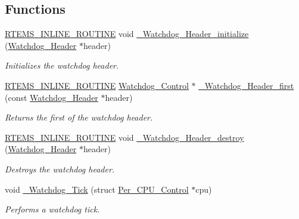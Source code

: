 \subsection*{Functions}
\begin{DoxyCompactItemize}
\item 
\mbox{\hyperlink{group__RTEMSScoreBaseDefs_gac216239df231d5dbd15e3520b0b9313f}{R\+T\+E\+M\+S\+\_\+\+I\+N\+L\+I\+N\+E\+\_\+\+R\+O\+U\+T\+I\+NE}} void \mbox{\hyperlink{group__RTEMSScoreWatchdog_ga6566cd6322fc45173038e64d3232dc0b}{\+\_\+\+Watchdog\+\_\+\+Header\+\_\+initialize}} (\mbox{\hyperlink{structWatchdog__Header}{Watchdog\+\_\+\+Header}} $\ast$header)
\begin{DoxyCompactList}\small\item\em Initializes the watchdog header. \end{DoxyCompactList}\item 
\mbox{\hyperlink{group__RTEMSScoreBaseDefs_gac216239df231d5dbd15e3520b0b9313f}{R\+T\+E\+M\+S\+\_\+\+I\+N\+L\+I\+N\+E\+\_\+\+R\+O\+U\+T\+I\+NE}} \mbox{\hyperlink{structWatchdog__Control}{Watchdog\+\_\+\+Control}} $\ast$ \mbox{\hyperlink{group__RTEMSScoreWatchdog_ga9b0af8778de4a421e9ef517ff371bb3b}{\+\_\+\+Watchdog\+\_\+\+Header\+\_\+first}} (const \mbox{\hyperlink{structWatchdog__Header}{Watchdog\+\_\+\+Header}} $\ast$header)
\begin{DoxyCompactList}\small\item\em Returns the first of the watchdog header. \end{DoxyCompactList}\item 
\mbox{\hyperlink{group__RTEMSScoreBaseDefs_gac216239df231d5dbd15e3520b0b9313f}{R\+T\+E\+M\+S\+\_\+\+I\+N\+L\+I\+N\+E\+\_\+\+R\+O\+U\+T\+I\+NE}} void \mbox{\hyperlink{group__RTEMSScoreWatchdog_ga7227eda50b7bf164aa31cfcd9a9d8cca}{\+\_\+\+Watchdog\+\_\+\+Header\+\_\+destroy}} (\mbox{\hyperlink{structWatchdog__Header}{Watchdog\+\_\+\+Header}} $\ast$header)
\begin{DoxyCompactList}\small\item\em Destroys the watchdog header. \end{DoxyCompactList}\item 
void \mbox{\hyperlink{group__RTEMSScoreWatchdog_ga7705de6ce93be198c7758b869234862f}{\+\_\+\+Watchdog\+\_\+\+Tick}} (struct \mbox{\hyperlink{structPer__CPU__Control}{Per\+\_\+\+C\+P\+U\+\_\+\+Control}} $\ast$cpu)
\begin{DoxyCompactList}\small\item\em Performs a watchdog tick. \end{DoxyCompactList}\item 

\end{DoxyCompactItemize}
